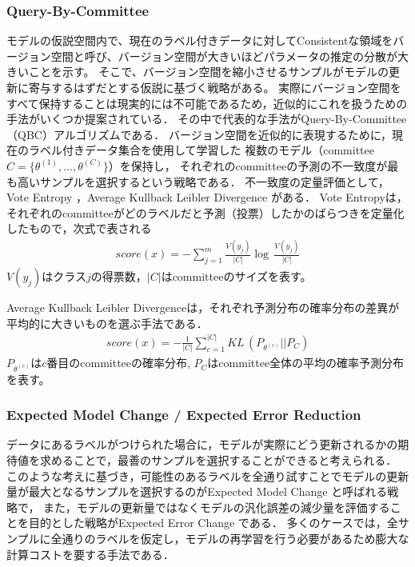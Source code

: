 \subsubsection{Query-By-Committee \cite{seung1992query}}
モデルの仮説空間内で、現在のラベル付きデータに対してConsistentな領域をバージョン空間と呼び、バージョン空間が大きいほどパラメータの推定の分散が大きいことを示す。
そこで、バージョン空間を縮小させるサンプルがモデルの更新に寄与するはずだとする仮説に基づく戦略がある。
実際にバージョン空間をすべて保持することは現実的には不可能であるため，近似的にこれを扱うための手法がいくつか提案されている．
その中で代表的な手法がQuery-By-Committee（QBC）アルゴリズム\cite{seung1992query}である．
バージョン空間を近似的に表現するために，現在のラベル付きデータ集合を使用して学習した
複数のモデル（committee $C=\{ \theta^{(1)}, \dots, \theta^{(C)}\}$）を保持し，
それぞれのcommitteeの予測の不一致度が最も高いサンプルを選択するという戦略である．
不一致度の定量評価として，Vote Entropy \cite{dagan1995committee}，Average Kullback Leibler Divergence \cite{mccallum1998employing}がある．
Vote Entropyは，それぞれのcommitteeがどのラベルだと予測（投票）したかのばらつきを定量化したもので，次式で表される
\begin{eqnarray}
    score(x) =  - \sum_{j=1}^{m} \frac{V(y_j)}{|C|} \log \, \frac{V(y_j)}{|C|}
\end{eqnarray}
$V(y_j)$はクラス$j$の得票数，$|C|$はcommitteeのサイズを表す。

Average Kullback Leibler Divergenceは，それぞれ予測分布の確率分布の差異が平均的に大きいものを選ぶ手法である．
\begin{eqnarray}
    score(x) =  -  \frac{1}{|C|} \sum_{c=1}^{|C|} KL \, (P_{\theta^{(c)}} || P_{C})
\end{eqnarray}
$P_{\theta^{(c)}}$は$c$番目のcommitteeの確率分布, $P_C$はcommittee全体の平均の確率予測分布を表す。

\subsubsection{Expected Model Change \cite{settles2008multiple} / Expected Error Reduction \cite{roy2001toward}}
データにあるラベルがつけられた場合に，モデルが実際にどう更新されるかの期待値を求めることで，最善のサンプルを選択することができると考えられる．
このような考えに基づき，可能性のあるラベルを全通り試すことでモデルの更新量が最大となるサンプルを選択するのがExpected Model Change \cite{settles2008multiple}と呼ばれる戦略で，
また，モデルの更新量ではなくモデルの汎化誤差の減少量を評価することを目的とした戦略がExpected Error Change \cite{roy2001toward}である．
多くのケースでは，全サンプルに全通りのラベルを仮定し，モデルの再学習を行う必要があるため膨大な計算コストを要する手法である．

